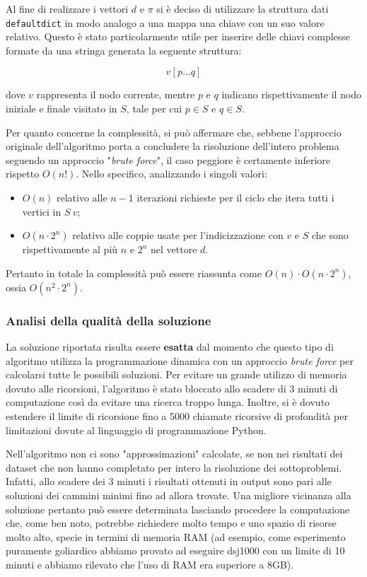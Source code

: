 Al fine di realizzare i vettori \(d\) e \(\pi\) si è deciso di utilizzare la struttura dati \texttt{defaultdict} in modo analogo a una mappa una chiave con un suo valore relativo. Questo è stato particolarmente utile per inserire delle chiavi complesse formate da una stringa generata la seguente struttura: 

\[ v [ p \dots q ]\]

dove \(v\) rappresenta il nodo corrente, mentre \(p\) e \(q\) indicano rispettivamente il nodo iniziale e finale visitato in \(S\), tale per cui \(p \in S\) e \(q \in S\).

Per quanto concerne la complessità, si può affermare che, sebbene l'approccio originale dell'algoritmo porta a concludere la risoluzione dell'intero problema seguendo un approccio "\textit{brute force}", il caso peggiore è certamente inferiore rispetto \(O(n!)\). 
Nello specifico, analizzando i singoli valori:

\begin{itemize}
    \item \(O(n)\) relativo alle \(n-1\) iterazioni richieste per il ciclo che itera tutti i vertici in \(S \ {v}\);
    \item \(O(n\cdot2^n)\) relativo alle coppie usate per l'indicizzazione con \(v\) e \(S\) che sono rispettivamente al più \(n\) e \(2^n\) nel vettore \(d\).
\end{itemize}
Pertanto in totale la complessità può essere riassunta come \(O(n) \cdot O(n\cdot2^n)\), ossia \(O(n^2\cdot2^n)\).

\subsubsection{Analisi della qualità della soluzione}

La soluzione riportata risulta essere \textbf{esatta} dal momento che questo tipo di algoritmo utilizza la programmazione dinamica con un approccio \textit{brute force} per calcolarsi tutte le possibili soluzioni. Per evitare un grande utilizzo di memoria dovuto alle ricorsioni, l'algoritmo è stato bloccato allo scadere di 3 minuti di computazione così da evitare una ricerca troppo lunga.
Inoltre, si è dovuto estendere il limite di ricorsione fino a 5000 chiamate ricorsive di profondità per limitazioni dovute al linguaggio di programmazione Python.

Nell'algoritmo non ci sono "approssimazioni" calcolate, se non nei risultati dei dataset che non hanno completato per intero la risoluzione dei sottoproblemi. Infatti, allo scadere dei 3 minuti i risultati ottenuti in output sono pari alle soluzioni dei cammini minimi fino ad allora trovate. Una migliore vicinanza alla soluzione pertanto può essere determinata lasciando procedere la computazione che, come ben noto, potrebbe richiedere molto tempo e uno spazio di risorse molto alto, specie in termini di memoria RAM (ad esempio, come esperimento puramente goliardico abbiamo provato ad eseguire dsj1000 con un limite di 10 minuti e abbiamo rilevato che l'uso di RAM era superiore a 8GB). 

